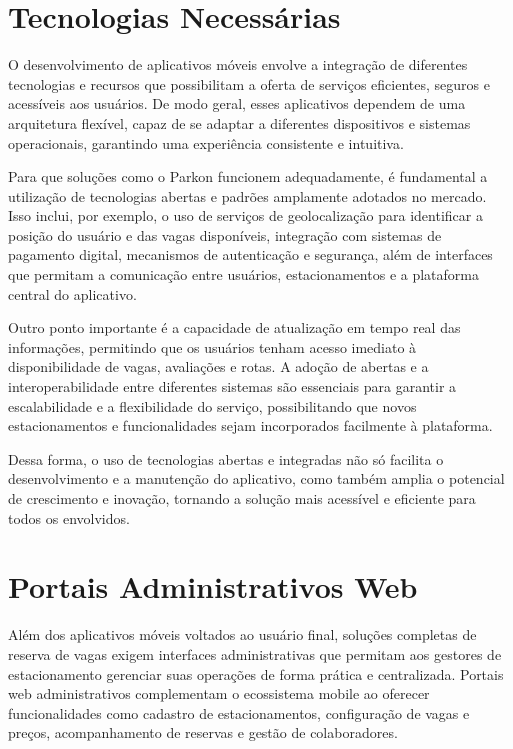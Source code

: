 \section{Tecnologias Necessárias}
\label{sec:tecnologias}

O desenvolvimento de aplicativos móveis envolve a integração de diferentes tecnologias e recursos que possibilitam a oferta de serviços eficientes, seguros e acessíveis aos usuários. De modo geral, esses aplicativos dependem de uma arquitetura flexível, capaz de se adaptar a diferentes dispositivos e sistemas operacionais, garantindo uma experiência consistente e intuitiva.

Para que soluções como o Parkon funcionem adequadamente, é fundamental a utilização de tecnologias abertas e padrões amplamente adotados no mercado. Isso inclui, por exemplo, o uso de serviços de geolocalização para identificar a posição do usuário e das vagas disponíveis, integração com sistemas de pagamento digital, mecanismos de autenticação e segurança, além de interfaces que permitam a comunicação entre usuários, estacionamentos e a plataforma central do aplicativo.

Outro ponto importante é a capacidade de atualização em tempo real das informações, permitindo que os usuários tenham acesso imediato à disponibilidade de vagas, avaliações e rotas. A adoção de  abertas e a interoperabilidade entre diferentes sistemas são essenciais para garantir a escalabilidade e a flexibilidade do serviço, possibilitando que novos estacionamentos e funcionalidades sejam incorporados facilmente à plataforma.

Dessa forma, o uso de tecnologias abertas e integradas não só facilita o desenvolvimento e a manutenção do aplicativo, como também amplia o potencial de crescimento e inovação, tornando a solução mais acessível e eficiente para todos os envolvidos.


\section{Portais Administrativos Web}
\label{sec:portais-administrativos}

Além dos aplicativos móveis voltados ao usuário final, soluções completas de reserva de vagas exigem interfaces administrativas que permitam aos gestores de estacionamento gerenciar suas operações de forma prática e centralizada. Portais web administrativos complementam o ecossistema mobile ao oferecer funcionalidades como cadastro de estacionamentos, configuração de vagas e preços, acompanhamento de reservas e gestão de colaboradores.


